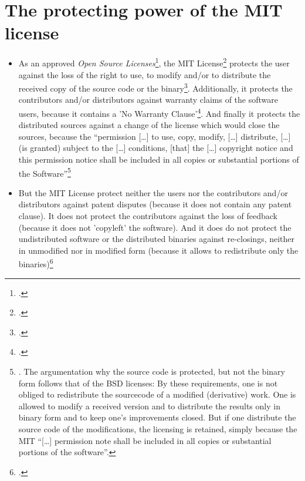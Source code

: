 \section{The protecting power of the MIT license}
\begin{itemize}
  \item As an approved \emph{Open Source Licenses}\footcite[cf.][\nopage
  wp]{OSI2012b}, the MIT License\footcite[MIT has to be resolved as
  \enquote{Massachusetts Institute of Technology} 
  (cf.][\nopage wp).]{wpMitLic2011a} protects the user against the loss of the
  right to use, to modify and/or to distribute the received copy of the source
  code or the binary\footcite[cf.][\nopage wp 1ff]{OSI2012a}. Additionally, it
  protects the contributors and/or distributors against warranty claims of the
  software users, because it contains a 'No Warranty
  Clause'\footcite[cf.][\nopage wp]{MitLicense2012a}. And finally it protects
  the distributed sources against a change of the license which would close the
  sources, because the \enquote{permission [\ldots] to use, copy, modify,
  [\ldots] distribute, [\ldots] (is granted) subject to the [\ldots] conditions,
  [that] the [\ldots] copyright notice and this permission notice shall be
  included in all copies or substantial portions of the
  Software}\footnote{\cite[cf.][\nopage wp]{MitLicense2012a}. The argumentation
  why the source code is protected, but not the binary form follows that of the
  BSD licenses: By these requirements, one is not obliged to redistribute the
  sourcecode of a modified (derivative) work. One is allowed to modify a
  received version and to distribute the results only in binary form and to keep
  one's improvements closed. But if one distribute the source code of the
  modifications, the licensing is retained, simply because the MIT
  \enquote{[\ldots] permission note shall be included in all copies or
  substantial portions of the software}.}
 
  \item But the MIT License protect neither the users nor the contributors
  and/or distributors against patent disputes (because it does not contain any
  patent clause). It does not protect the contributors against the loss of
  feedback (because it does not 'copyleft' the software). And it does do not
  protect the undistributed software or the distributed binaries against
  re-closings, neither in unmodified nor in modified form (because it allows to
  redistribute only the binaries)\footcite[cf.][\nopage wp]{MitLicense2012a}
  
\end{itemize}


